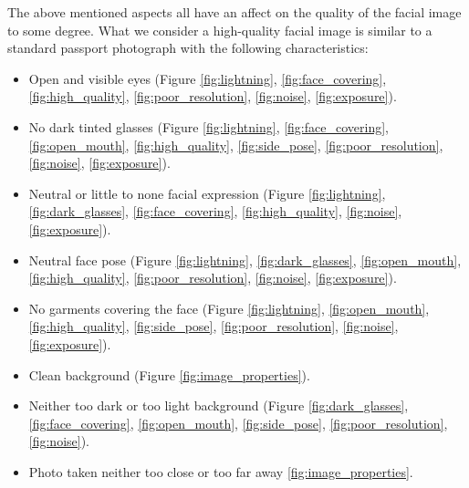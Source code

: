 The above mentioned aspects all have an affect on the quality of the facial image to some degree. What we consider a high-quality facial image is similar to a standard passport photograph with the following characteristics: 
\begin{itemize}
\label{item:passport}
    \item Open and visible eyes (Figure \ref{fig:lightning}, \ref{fig:face_covering}, \ref{fig:high_quality}, \ref{fig:poor_resolution}, \ref{fig:noise}, \ref{fig:exposure}).
    \item No dark tinted glasses (Figure \ref{fig:lightning}, \ref{fig:face_covering}, \ref{fig:open_mouth}, \ref{fig:high_quality}, \ref{fig:side_pose}, \ref{fig:poor_resolution}, \ref{fig:noise}, \ref{fig:exposure}). 
    \item Neutral or little to none facial expression (Figure \ref{fig:lightning}, \ref{fig:dark_glasses}, \ref{fig:face_covering}, \ref{fig:high_quality}, \ref{fig:noise}, \ref{fig:exposure}).
    \item Neutral face pose (Figure \ref{fig:lightning}, \ref{fig:dark_glasses}, \ref{fig:open_mouth}, \ref{fig:high_quality}, \ref{fig:poor_resolution}, \ref{fig:noise}, \ref{fig:exposure}).
    \item No garments covering the face (Figure \ref{fig:lightning}, \ref{fig:open_mouth}, \ref{fig:high_quality}, \ref{fig:side_pose}, \ref{fig:poor_resolution}, \ref{fig:noise}, \ref{fig:exposure}). 
    \item Clean background (Figure \ref{fig:image_properties}).
    \item Neither too dark or too light background (Figure \ref{fig:dark_glasses}, \ref{fig:face_covering}, \ref{fig:open_mouth}, \ref{fig:side_pose}, \ref{fig:poor_resolution}, \ref{fig:noise}).
    \item Photo taken neither too close or too far away \ref{fig:image_properties}.
\end{itemize} 

